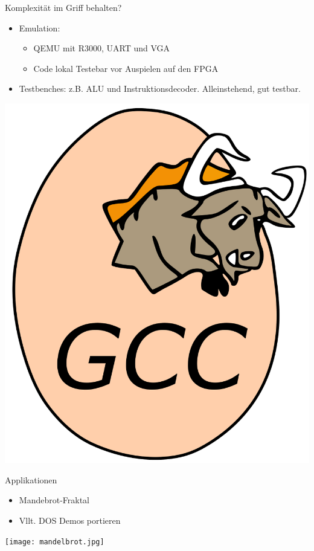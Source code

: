 \begin{frame}{Komplexität im Griff behalten?}

\begin{itemize}
\item Emulation:
\begin{itemize}
    \item QEMU mit R3000, UART und VGA
    \item Code lokal Testebar vor Auspielen auf den FPGA
\end{itemize}
    \item Testbenches: z.B. ALU und Instruktionsdecoder. Alleinstehend, gut testbar.
\end{itemize}
\begin{center}
\includegraphics[scale=0.10]{gcc.png}
\end{center}


\end{frame}


\begin{frame}{Applikationen}
\begin{itemize}
\item Mandebrot-Fraktal
\item Vllt. DOS Demos portieren
\end{itemize}

\begin{center}
\texttt{[image: mandelbrot.jpg]}
\end{center}


\end{frame}


